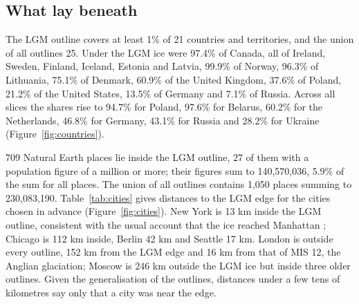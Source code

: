 \documentclass[11pt,a4paper]{article}
\begin{document}
\subsection{What lay beneath}
The LGM outline covers at least 1\% of 21 countries and territories, and the union of all outlines 25. Under the LGM ice were 97.4\% of Canada, all of Ireland, Sweden, Finland, Iceland, Estonia and Latvia, 99.9\% of Norway, 96.3\% of Lithuania, 75.1\% of Denmark, 60.9\% of the United Kingdom, 37.6\% of Poland, 21.2\% of the United States, 13.5\% of Germany and 7.1\% of Russia. Across all slices the shares rise to 94.7\% for Poland, 97.6\% for Belarus, 60.2\% for the Netherlands, 46.8\% for Germany, 43.1\% for Russia and 28.2\% for Ukraine (Figure~\ref{fig:countries}).

709 Natural Earth places lie inside the LGM outline, 27 of them with a population figure of a million or more; their figures sum to 140,570,036, 5.9\% of the sum for all places. The union of all outlines contains 1,050 places summing to 230,083,190. Table~\ref{tab:cities} gives distances to the LGM edge for the cities chosen in advance (Figure~\ref{fig:cities}). New York is 13 km inside the LGM outline, consistent with the usual account that the ice reached Manhattan \citep{wiki}; Chicago is 112 km inside, Berlin 42 km and Seattle 17 km. London is outside every outline, 152 km from the LGM edge and 16 km from that of MIS 12, the Anglian glaciation; Moscow is 246 km outside the LGM ice but inside three older outlines. Given the generalisation of the outlines, distances under a few tens of kilometres say only that a city was near the edge.
\end{document}
